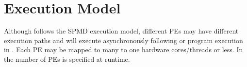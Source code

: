 %   
    

\section{Execution Model}
Although \openshmem follows the SPMD execution model, different \ac{PE}s may have different execution paths and will execute asynchronously following \Fortran{} or program execution in \Clang.  Each \ac{PE} may be mapped to many to one hardware cores/threads or less. In \openshmem the number of \ac{PE}s is specified at runtime.

